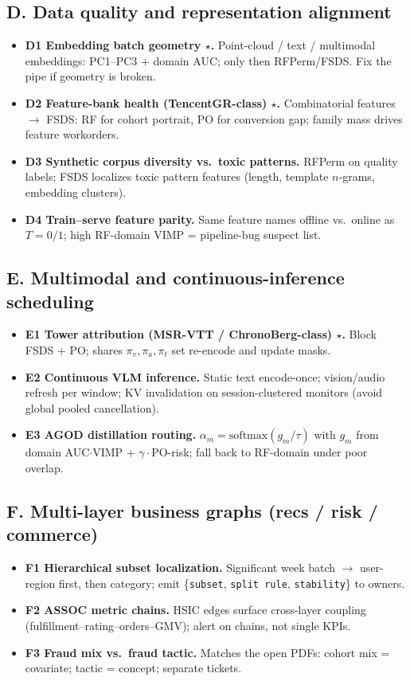 \documentclass[11pt,a4paper]{article}
\begin{document}
\subsection{D. Data quality and representation alignment}
\begin{itemize}
  \item \textbf{D1 Embedding batch geometry \(\star\).} Point-cloud / text / multimodal embeddings: PC1--PC3 + domain AUC; only then RFPerm/FSDS. Fix the pipe if geometry is broken.
  \item \textbf{D2 Feature-bank health (TencentGR-class) \(\star\).} Combinatorial features \(\to\) FSDS: RF for cohort portrait, PO for conversion gap; family mass drives feature workorders.
  \item \textbf{D3 Synthetic corpus diversity vs.\ toxic patterns.} RFPerm on quality labels; FSDS localizes toxic pattern features (length, template \(n\)-grams, embedding clusters).
  \item \textbf{D4 Train--serve feature parity.} Same feature names offline vs.\ online as \(T=0/1\); high RF-domain VIMP = pipeline-bug suspect list.
\end{itemize}

\subsection{E. Multimodal and continuous-inference scheduling}
\begin{itemize}
  \item \textbf{E1 Tower attribution (MSR-VTT / ChronoBerg-class) \(\star\).} Block FSDS + PO; shares \(\pi_v,\pi_a,\pi_t\) set re-encode and update masks.
  \item \textbf{E2 Continuous VLM inference.} Static text encode-once; vision/audio refresh per window; KV invalidation on session-clustered monitors (avoid global pooled cancellation).
  \item \textbf{E3 AGOD distillation routing.} \(\alpha_m=\mathrm{softmax}(g_m/\tau)\) with \(g_m\) from domain AUC\(\cdot\)VIMP + \(\gamma\cdot\)PO-risk; fall back to RF-domain under poor overlap.
\end{itemize}

\subsection{F. Multi-layer business graphs (recs / risk / commerce)}
\begin{itemize}
  \item \textbf{F1 Hierarchical subset localization.} Significant week batch \(\to\) user-region first, then category; emit \{\texttt{subset}, \texttt{split rule}, \texttt{stability}\} to owners.
  \item \textbf{F2 ASSOC metric chains.} HSIC edges surface cross-layer coupling (fulfillment--rating--orders--GMV); alert on chains, not single KPIs.
  \item \textbf{F3 Fraud mix vs.\ fraud tactic.} Matches the open PDFs: cohort mix = covariate; tactic = concept; separate tickets.
\end{itemize}
\end{document}
